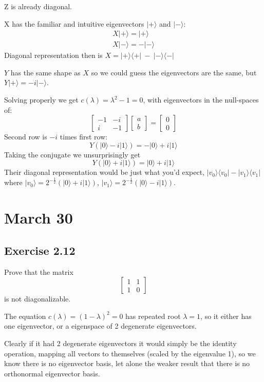 \documentclass[]{article}
\newcommand{\bra}[1]{\langle #1 |}
\newcommand{\ket}[1]{| #1 \rangle}
\begin{document}
Z is already diagonal.

X has the familiar and intuitive eigenvectors $\ket{+}$ and $\ket{-}$:
\begin{align*}
	X\ket{+} = \ket{+} \\
	X\ket{-} = -\ket{-}
\end{align*}
Diagonal representation then is $X = \ket{+}\bra{+}\ -\ \ket{-}\bra{-}$

$Y$ has the same shape as $X$ so we could guess the eigenvectors are the same,
but $Y\ket{+} = -i\ket{-}$.

Solving properly we get $c(\lambda) = \lambda^2 - 1 = 0$, with eigenvectors in the null-spaces of:
\[
\left[\begin{matrix}-1&-i\\i&-1\end{matrix}\right]
\left[\begin{matrix}a\\b\end{matrix}\right]
=\left[\begin{matrix}0\\0\end{matrix}
\right]
\]
Second row is $-i$ times first row:
\[Y(\ket{0} -i \ket{1}) = -\ket{0} +i\ket{1}\]
Taking the conjugate we unsurprisingly get
\[Y(\ket{0} +i \ket{1}) = \ket{0} +i\ket{1}\]
Their diagonal representation would be just what you'd expect,
$\ket{v_0}\bra{v_0} - \ket{v_1}\bra{v_1}$ where $\ket{v_0} =
2^{-\frac{1}{2}}\left(\ket{0} + i\ket{1}\right)$, $\ket{v_1}
= 2^{-\frac{1}{2}}\left(\ket{0} - i\ket{1}\right)$.

\section{March 30}
\subsection{Exercise 2.12}
Prove that the matrix
\[\left[\begin{matrix}1&1\\1&0\end{matrix}\right]\]
is not diagonalizable.

The equation $c(\lambda) = (1-\lambda)^2 = 0$ has repeated root $\lambda = 1$, so it either has one eigenvector, or a eigenspace of 2 degenerate eigenvectors.

Clearly if it had 2 degenerate eigenvectors it would simply be the identity operation, mapping all vectors to themselves (scaled by the eigenvalue 1), so we know there is no eigenvector basis, let alone the weaker result that there is no orthonormal eigenvector basis.
\end{document}
